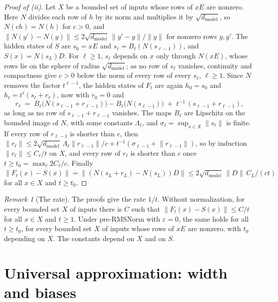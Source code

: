 \documentclass[10pt]{article}
\theoremstyle{definition}
\theoremstyle{remark}
\newtheorem{remark}[theorem]{Remark}
\newcommand{\dm}{d_{\mathrm{model}}}
\newcommand{\norm}[1]{\lVert #1\rVert}
\begin{document}
\begin{proof}[Proof of (ii)]
Let $X$ be a bounded set of inputs whose rows of $xE$ are nonzero. Here $N$ divides each row of $h$ by its norm and multiplies it by $\sqrt{\dm}$, so $N(ch) = N(h)$ for $c > 0$, and $\norm{N(y') - N(y)} \le 2\sqrt{\dm}\,\norm{y' - y}/\norm{y}$ for nonzero rows $y, y'$. The hidden states of $S$ are $s_0 = xE$ and $s_\ell = B_\ell(N(s_{\ell-1}))$, and $S(x) = N(s_L)D$. For $\ell \ge 1$, $s_\ell$ depends on $x$ only through $N(xE)$, whose rows lie on the sphere of radius $\sqrt{\dm}$; as no row of $s_\ell$ vanishes, continuity and compactness give $c > 0$ below the norm of every row of every $s_\ell$, $\ell \ge 1$. Since $N$ removes the factor $t^{\ell-1}$, the hidden states of $F_t$ are again $h_0 = s_0$ and $h_\ell = t^\ell(s_\ell + r_\ell)$, now with $r_0 = 0$ and
\[
r_\ell \;=\; B_\ell\big(N(s_{\ell-1} + r_{\ell-1})\big) - B_\ell\big(N(s_{\ell-1})\big) \;+\; t^{-1}\,(s_{\ell-1} + r_{\ell-1}),
\]
as long as no row of $s_{\ell-1} + r_{\ell-1}$ vanishes. The maps $B_\ell$ are Lipschitz on the bounded image of $N$, with some constants $\Lambda_\ell$, and $\sigma_\ell = \sup_{x \in X}\norm{s_\ell}$ is finite. If every row of $r_{\ell-1}$ is shorter than $c$, then $\norm{r_\ell} \le 2\sqrt{\dm}\,\Lambda_\ell\norm{r_{\ell-1}}/c + t^{-1}(\sigma_{\ell-1} + \norm{r_{\ell-1}})$, so by induction $\norm{r_\ell} \le C_\ell/t$ on $X$, and every row of $r_\ell$ is shorter than $c$ once $t \ge t_0 = \max_\ell 2C_\ell/c$. Finally $\norm{F_t(x) - S(x)} = \norm{(N(s_L + r_L) - N(s_L))D} \le 2\sqrt{\dm}\,\norm{D}\,C_L/(ct)$ for all $x \in X$ and $t \ge t_0$.
\end{proof}

\begin{remark}[The rate]\label{rem:limitrate}
The proofs give the rate $1/t$. Without normalization, for every bounded set $X$ of inputs there is $C$ such that $\norm{F_t(x) - S(x)} \le C/t$ for all $x \in X$ and $t \ge 1$. Under pre-RMSNorm with $\varepsilon = 0$, the same holds for all $t \ge t_0$, for every bounded set $X$ of inputs whose rows of $xE$ are nonzero, with $t_0$ depending on $X$. The constants depend on $X$ and on $S$.
\end{remark}

\section{Universal approximation: width and biases}\label{app:universal}
\end{document}
